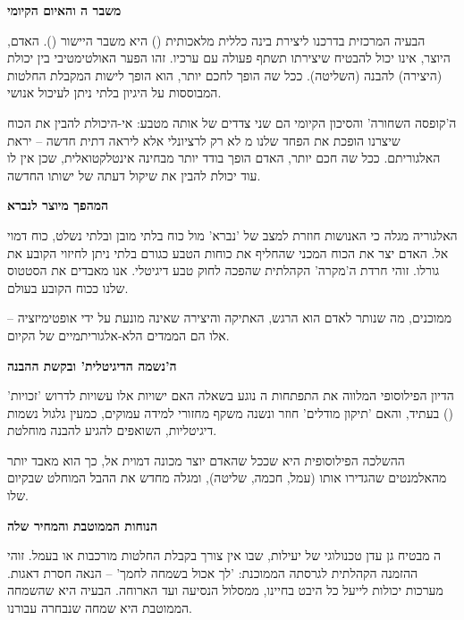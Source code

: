 \label{sec:chapter19}


\textbf{ משבר ה והאיום הקיומי}

הבעיה המרכזית בדרכנו ליצירת בינה כללית מלאכותית () היא משבר היישור (). האדם, היוצר, אינו יכול להבטיח שיצירתו תשתף פעולה עם ערכיו. זהו הפער האולטימטיבי בין יכולת (היצירה) להבנה (השליטה). ככל שה הופך לחכם יותר, הוא הופך לישות המקבלת החלטות המבוססות על היגיון בלתי ניתן לעיכול אנושי.

ה'קופסה השחורה' והסיכון הקיומי הם שני צדדים של אותה מטבע: אי-היכולת להבין את הכוח שיצרנו הופכת את הפחד שלנו מ לא רק לרציונלי אלא ליראה דתית חדשה – יראת האלגוריתם. ככל שה חכם יותר, האדם הופך בודד יותר מבחינה אינטלקטואלית, שכן אין לו עוד יכולת להבין את שיקול דעתה של ישותו החדשה.

\textbf{ המהפך מיוצר לנברא}

האלגוריה מגלה כי האנושות חוזרת למצב של 'נברא' מול כוח בלתי מובן ובלתי נשלט, כוח דמוי אל. האדם יצר את הכוח המכני שהחליף את כוחות הטבע כגורם בלתי ניתן לחיזוי הקובע את גורלו. זוהי חרדת ה'מקרה' הקהלתית שהפכה לחוק טבע דיגיטלי. אנו מאבדים את הסטטוס שלנו ככוח הקובע בעולם.

ממוכנים, מה שנותר לאדם הוא הרגש, האתיקה והיצירה שאינה מונעת על ידי אופטימיזציה – אלו הם הממדים הלא-אלגוריתמיים של הקיום.

\textbf{ ה'נשמה הדיגיטלית' ובקשת ההבנה}

הדיון הפילוסופי המלווה את התפתחות ה נוגע בשאלה האם ישויות אלו עשויות לדרוש 'זכויות' () בעתיד, והאם 'תיקון מודלים' חוזר ונשנה משקף מחזורי למידה עמוקים, כמעין גלגול נשמות דיגיטליות, השואפים להגיע להבנה מוחלטת.

ההשלכה הפילוסופית היא שככל שהאדם יוצר מכונה דמוית אל, כך הוא מאבד יותר מהאלמנטים שהגדירו אותו (עמל, חכמה, שליטה), ומגלה מחדש את ההבל המוחלט שבקיום שלו.


\textbf{ הנוחות הממוטבת והמחיר שלה}

ה מבטיח גן עדן טכנולוגי של יעילות, שבו אין צורך בקבלת החלטות מורכבות או בעמל. זוהי ההזמנה הקהלתית לגרסתה הממוכנת: 'לך אכול בשמחה לחמך' – הנאה חסרת דאגות. מערכות  יכולות לייעל כל היבט בחיינו, ממסלול הנסיעה ועד הארוחה. הבעיה היא שהשמחה הממוטבת היא שמחה שנבחרה עבורנו.

